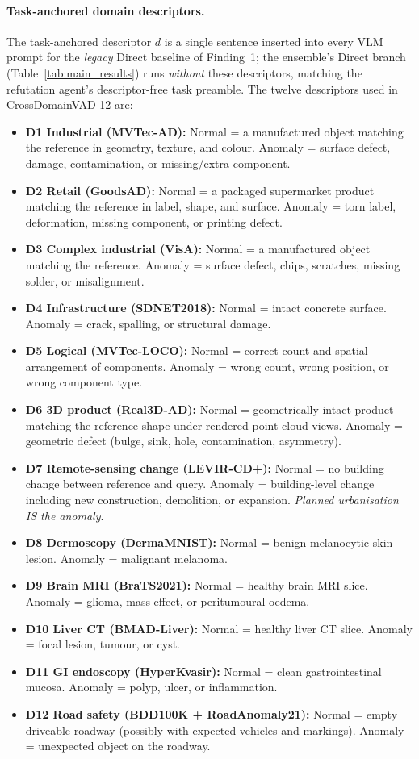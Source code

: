 \paragraph{Task-anchored domain descriptors.}
The task-anchored descriptor $d$ is a single sentence inserted into every VLM prompt for the \emph{legacy} Direct baseline of Finding~1;  the ensemble's Direct branch (Table~\ref{tab:main_results}) runs \emph{without} these descriptors, matching the refutation agent's descriptor-free task preamble. The twelve descriptors used in CrossDomainVAD-12 are:
\begin{itemize}\small\setlength\itemsep{1pt}
    \item \textbf{D1 Industrial (MVTec-AD):} Normal = a manufactured object matching the reference in geometry, texture, and colour. Anomaly = surface defect, damage, contamination, or missing/extra component.
    \item \textbf{D2 Retail (GoodsAD):} Normal = a packaged supermarket product matching the reference in label, shape, and surface. Anomaly = torn label, deformation, missing component, or printing defect.
    \item \textbf{D3 Complex industrial (VisA):} Normal = a manufactured object matching the reference. Anomaly = surface defect, chips, scratches, missing solder, or misalignment.
    \item \textbf{D4 Infrastructure (SDNET2018):} Normal = intact concrete surface. Anomaly = crack, spalling, or structural damage.
    \item \textbf{D5 Logical (MVTec-LOCO):} Normal = correct count and spatial arrangement of components. Anomaly = wrong count, wrong position, or wrong component type.
    \item \textbf{D6 3D product (Real3D-AD):} Normal = geometrically intact product matching the reference shape under rendered point-cloud views. Anomaly = geometric defect (bulge, sink, hole, contamination, asymmetry).
    \item \textbf{D7 Remote-sensing change (LEVIR-CD+):} Normal = no building change between reference and query. Anomaly = building-level change including new construction, demolition, or expansion. \emph{Planned urbanisation IS the anomaly}.
    \item \textbf{D8 Dermoscopy (DermaMNIST):} Normal = benign melanocytic skin lesion. Anomaly = malignant melanoma.
    \item \textbf{D9 Brain MRI (BraTS2021):} Normal = healthy brain MRI slice. Anomaly = glioma, mass effect, or peritumoural oedema.
    \item \textbf{D10 Liver CT (BMAD-Liver):} Normal = healthy liver CT slice. Anomaly = focal lesion, tumour, or cyst.
    \item \textbf{D11 GI endoscopy (HyperKvasir):} Normal = clean gastrointestinal mucosa. Anomaly = polyp, ulcer, or inflammation.
    \item \textbf{D12 Road safety (BDD100K + RoadAnomaly21):} Normal = empty driveable roadway (possibly with expected vehicles and markings). Anomaly = unexpected object on the roadway.
\end{itemize}

